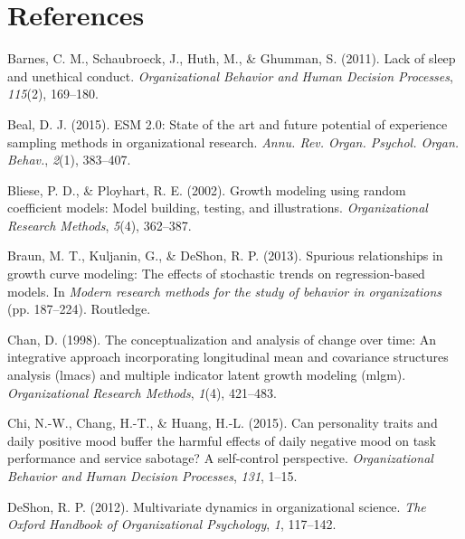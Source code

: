 \documentclass[english,,man]{apa6}
\theoremstyle{definition}
\theoremstyle{definition}
\theoremstyle{definition}
\theoremstyle{remark}
\begin{document}
\newpage

\hypertarget{references}{%
\section{References}\label{references}}

\setlength{\parindent}{-0.5in}
\setlength{\leftskip}{0.5in}

\hypertarget{refs}{}
\leavevmode\hypertarget{ref-barnes_lack_2011}{}%
Barnes, C. M., Schaubroeck, J., Huth, M., \& Ghumman, S. (2011). Lack of
sleep and unethical conduct. \emph{Organizational Behavior and Human
Decision Processes}, \emph{115}(2), 169--180.

\leavevmode\hypertarget{ref-beal_esm_2015}{}%
Beal, D. J. (2015). ESM 2.0: State of the art and future potential of
experience sampling methods in organizational research. \emph{Annu. Rev.
Organ. Psychol. Organ. Behav.}, \emph{2}(1), 383--407.

\leavevmode\hypertarget{ref-bliese_growth_2002}{}%
Bliese, P. D., \& Ployhart, R. E. (2002). Growth modeling using random
coefficient models: Model building, testing, and illustrations.
\emph{Organizational Research Methods}, \emph{5}(4), 362--387.

\leavevmode\hypertarget{ref-braun2013spurious}{}%
Braun, M. T., Kuljanin, G., \& DeShon, R. P. (2013). Spurious
relationships in growth curve modeling: The effects of stochastic trends
on regression-based models. In \emph{Modern research methods for the
study of behavior in organizations} (pp. 187--224). Routledge.

\leavevmode\hypertarget{ref-chan1998conceptualization}{}%
Chan, D. (1998). The conceptualization and analysis of change over time:
An integrative approach incorporating longitudinal mean and covariance
structures analysis (lmacs) and multiple indicator latent growth
modeling (mlgm). \emph{Organizational Research Methods}, \emph{1}(4),
421--483.

\leavevmode\hypertarget{ref-chi_can_2015}{}%
Chi, N.-W., Chang, H.-T., \& Huang, H.-L. (2015). Can personality traits
and daily positive mood buffer the harmful effects of daily negative
mood on task performance and service sabotage? A self-control
perspective. \emph{Organizational Behavior and Human Decision
Processes}, \emph{131}, 1--15.

\leavevmode\hypertarget{ref-deshon_multivariate_2012}{}%
DeShon, R. P. (2012). Multivariate dynamics in organizational science.
\emph{The Oxford Handbook of Organizational Psychology}, \emph{1},
117--142.
\end{document}
